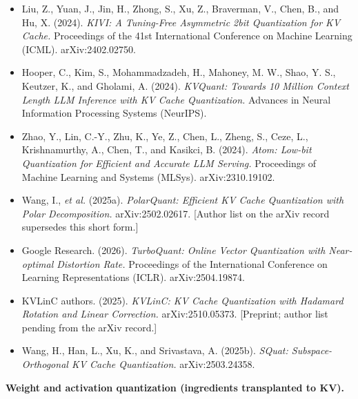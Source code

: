 \begin{itemize}
\tightlist
\item
  Liu, Z., Yuan, J., Jin, H., Zhong, S., Xu, Z., Braverman, V., Chen,
  B., and Hu, X. (2024). \emph{KIVI: A Tuning-Free Asymmetric 2bit
  Quantization for KV Cache.} Proceedings of the 41st International
  Conference on Machine Learning (ICML). arXiv:2402.02750.
\item
  Hooper, C., Kim, S., Mohammadzadeh, H., Mahoney, M. W., Shao, Y. S.,
  Keutzer, K., and Gholami, A. (2024). \emph{KVQuant: Towards 10 Million
  Context Length LLM Inference with KV Cache Quantization.} Advances in
  Neural Information Processing Systems (NeurIPS).
\item
  Zhao, Y., Lin, C.-Y., Zhu, K., Ye, Z., Chen, L., Zheng, S., Ceze, L.,
  Krishnamurthy, A., Chen, T., and Kasikci, B. (2024). \emph{Atom:
  Low-bit Quantization for Efficient and Accurate LLM Serving.}
  Proceedings of Machine Learning and Systems (MLSys). arXiv:2310.19102.
\item
  Wang, I., \emph{et al.} (2025a). \emph{PolarQuant: Efficient KV Cache
  Quantization with Polar Decomposition.} arXiv:2502.02617. {[}Author
  list on the arXiv record supersedes this short form.{]}
\item
  Google Research. (2026). \emph{TurboQuant: Online Vector Quantization
  with Near-optimal Distortion Rate.} Proceedings of the International
  Conference on Learning Representations (ICLR). arXiv:2504.19874.
\item
  KVLinC authors. (2025). \emph{KVLinC: KV Cache Quantization with
  Hadamard Rotation and Linear Correction.} arXiv:2510.05373.
  {[}Preprint; author list pending from the arXiv record.{]}
\item
  Wang, H., Han, L., Xu, K., and Srivastava, A. (2025b). \emph{SQuat:
  Subspace-Orthogonal KV Cache Quantization.} arXiv:2503.24358.
\end{itemize}

\textbf{Weight and activation quantization (ingredients transplanted to
KV).}

